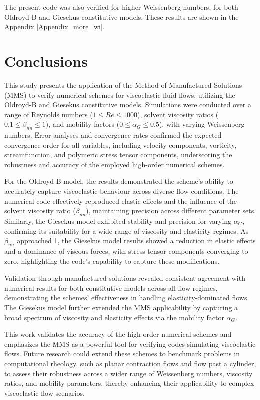 \documentclass[preprint, 12pt]{elsarticle}
\begin{document}
The present code was also verified for higher Weissenberg numbers, for both Oldroyd-B and Giesekus constitutive models. These results are shown in the Appendix \ref{Appendix_more_wi}.


\section{Conclusions}\label{sec_Conclusions}

This study presents the application of the Method of Manufactured Solutions (MMS) to verify numerical schemes for viscoelastic fluid flows, utilizing the Oldroyd-B and Giesekus constitutive models. Simulations were conducted over a range of Reynolds numbers (\( 1 \leq Re \leq 1000 \)), solvent viscosity ratios (\( 0.1 \leq \beta_{nn} \leq 1 \)), and mobility factors (\( 0 \leq \alpha_G \leq 0.5 \)), with varying Weissenberg numbers. Error analyses and convergence rates confirmed the expected convergence order for all variables, including velocity components, vorticity, streamfunction, and polymeric stress tensor components, underscoring the robustness and accuracy of the employed high-order numerical schemes.

For the Oldroyd-B model, the results demonstrated the scheme's ability to accurately capture viscoelastic behaviour across diverse flow conditions. The numerical code effectively reproduced elastic effects and the influence of the solvent viscosity ratio (\( \beta_{nn} \)), maintaining precision across different parameter sets. Similarly, the Giesekus model exhibited stability and precision for varying \( \alpha_G \), confirming its suitability for a wide range of viscosity and elasticity regimes. As \( \beta_{nn} \) approached 1, the Giesekus model results showed a reduction in elastic effects and a dominance of viscous forces, with stress tensor components converging to zero, highlighting the code’s capability to capture these modifications.

Validation through manufactured solutions revealed consistent agreement with numerical results for both constitutive models across all flow regimes, demonstrating the schemes' effectiveness in handling elasticity-dominated flows. The Giesekus model further extended the MMS applicability by capturing a broad spectrum of viscosity and elasticity effects via the mobility factor \( \alpha_G \).

This work validates the accuracy of the high-order numerical schemes and emphasizes the MMS as a powerful tool for verifying codes simulating viscoelastic flows. Future research could extend these schemes to benchmark problems in computational rheology, such as planar contraction flows and flow past a cylinder, to assess their robustness across a wider range of Weissenberg numbers, viscosity ratios, and mobility parameters, thereby enhancing their applicability to complex viscoelastic flow scenarios.
\end{document}
